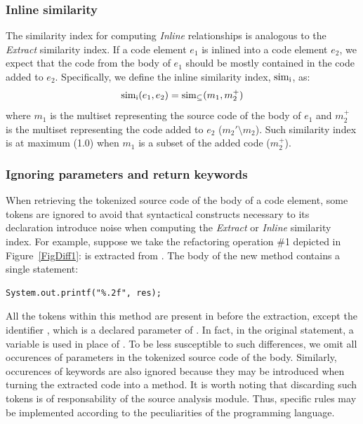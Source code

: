 \subsubsection{Inline similarity}
\label{SecSimI}

The similarity index for computing \textit{Inline} relationships is analogous to the \textit{Extract} similarity index.
If a code element $e_1$ is inlined into a code element $e_2$, we expect that the code from the body of $e_1$ should be mostly contained in the code added to $e_2$. Specifically, we define the inline similarity index, $\operatorname{sim_{i}}$, as:
\begin{align}
\operatorname{sim_{i}}(e_1, e_2) = \operatorname{sim_{\subseteq}}(m_1, m_2^+)
\end{align}
where $m_1$ is the multiset representing the source code of the body of $e_1$ and $m_2^+$ is the multiset representing the code added to $e_2$ ($m_2' \setminus m_2$). Such similarity index is at maximum (1.0) when $m_1$ is a subset of the added code ($m_2^+$).





\subsubsection{Ignoring parameters and return keywords}
\label{SecIgnoringReturn}

When retrieving the tokenized source code of the body of a code element, some tokens are ignored to avoid that syntactical constructs necessary to its declaration
introduce noise when computing the \textit{Extract} or \textit{Inline} similarity index.
For example, suppose we take the refactoring operation \#1 depicted in Figure~\ref{FigDiff1}:  is extracted from .
The body of the new method  contains a single statement:
\begin{lstlisting}
System.out.printf("%.2f", res);
\end{lstlisting}
All the tokens within this method are present in  before the extraction, except the identifier , which is a declared parameter of . In fact, in the original statement, a variable  is used in place of . To be less susceptible to such differences, we omit all occurences of parameters in the tokenized source code of the body. Similarly, occurences of  keywords are also ignored because they may be introduced when turning the extracted code into a method.
It is worth noting that discarding such tokens is of responsability of the source analysis module. Thus, specific rules may be implemented according to the peculiarities of the programming language.


